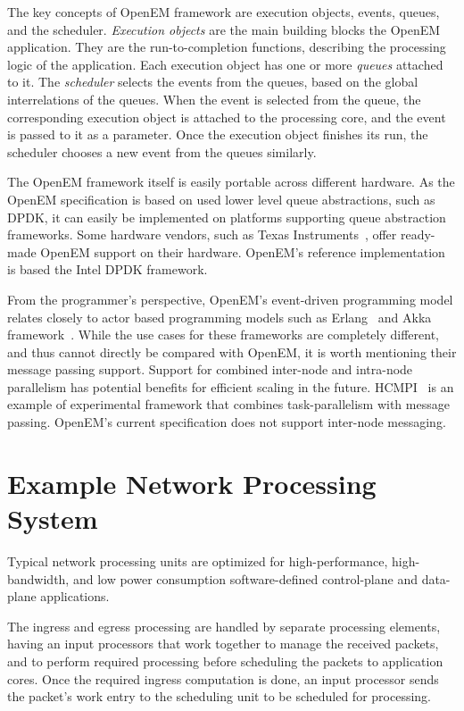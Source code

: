 The key concepts of OpenEM framework are execution objects, events, queues, and the scheduler. \emph{Execution objects} are the main building blocks the OpenEM application. They are the run-to-completion functions, describing the processing logic of the application. Each execution object has one or more \emph{queues} attached to it. The \emph{scheduler} selects the events from the queues, based on the global interrelations of the queues. When the event is selected from the queue, the corresponding execution object is attached to the processing core, and the event is passed to it as a parameter. Once the execution object finishes its run, the scheduler chooses a new event from the queues similarly.~\cite{NSN:2015:OpenEM}

The OpenEM framework itself is easily portable across different hardware. As the OpenEM specification is based on used lower level queue abstractions, such as DPDK, it can easily be implemented on platforms supporting queue abstraction frameworks. Some hardware vendors, such as Texas Instruments~\cite{TI:2012:OpenEM}, offer ready-made OpenEM support on their hardware. OpenEM's reference implementation is based the Intel DPDK framework.~\cite{NSN:2015:OpenEM}

From the programmer's perspective, OpenEM's event-driven programming model relates closely to actor based programming models such as Erlang~\cite{Armstrong:1996:CPE} and Akka framework~\cite{Akka}. While the use cases for these frameworks are completely different, and thus cannot directly be compared with OpenEM, it is worth mentioning their message passing support. Support for combined inter-node and intra-node parallelism has potential benefits for efficient scaling in the future. HCMPI~\cite{Chatterjee:2013:HCMPI} is an example of experimental framework that combines task-parallelism with message passing. OpenEM's current specification does not support inter-node messaging.

\section{Example Network Processing System}
\label{sec:example-network-processing-system}
Typical network processing units are optimized for high-performance, high-bandwidth, and low power consumption software-defined control-plane and data-plane applications.

The ingress and egress processing are handled by separate processing elements, having an input processors that work together to manage the received packets, and to perform required processing before scheduling the packets to application cores. Once the required ingress computation is done, an input processor sends the packet's work entry to the scheduling unit to be scheduled for processing.

